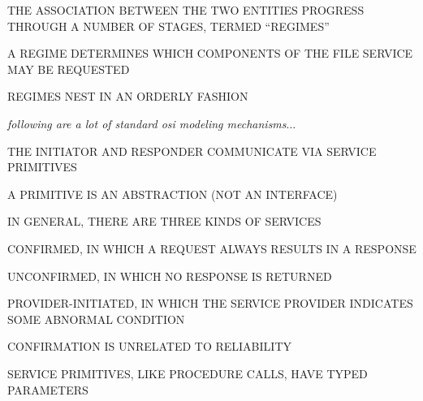 \begin{bwslide}

\begin{nrtc}
\item	THE ASSOCIATION BETWEEN THE TWO ENTITIES PROGRESS THROUGH A NUMBER
	OF STAGES, TERMED ``REGIMES''

\item	A REGIME DETERMINES WHICH COMPONENTS OF THE FILE SERVICE MAY BE
	REQUESTED

\item	REGIMES NEST IN AN ORDERLY FASHION
\end{nrtc}
\end{bwslide}


\begin{note}\em
following are a lot of standard osi modeling mechanisms$\ldots$
\end{note}


\begin{bwslide}

\begin{nrtc}
\item	THE INITIATOR AND RESPONDER COMMUNICATE VIA SERVICE PRIMITIVES

\item	A PRIMITIVE IS AN ABSTRACTION (NOT AN INTERFACE)

\item	IN GENERAL, THERE ARE THREE KINDS OF SERVICES
    \begin{nrtc}
    \item	CONFIRMED, IN WHICH A REQUEST ALWAYS RESULTS IN A RESPONSE

    \item	UNCONFIRMED, IN WHICH NO RESPONSE IS RETURNED

    \item	PROVIDER-INITIATED,
		IN WHICH THE SERVICE PROVIDER INDICATES SOME ABNORMAL
		CONDITION
    \end{nrtc}

\item	CONFIRMATION IS UNRELATED TO RELIABILITY

\item	SERVICE PRIMITIVES, LIKE PROCEDURE CALLS, HAVE TYPED PARAMETERS
\end{nrtc}
\end{bwslide}



